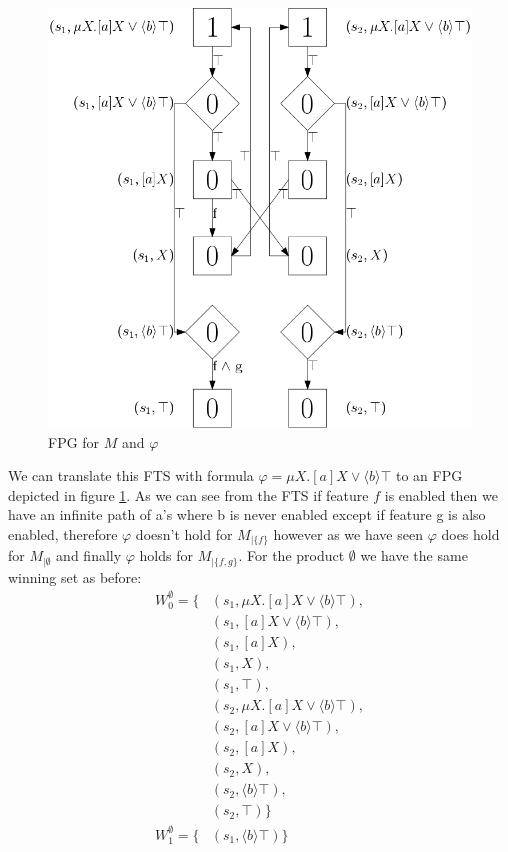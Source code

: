 \begin{figure}[h]
	\centering
	\includegraphics[scale=0.3]{Examples/ExamleVerification/FPG}
	\caption[FPG for $M$ and $\varphi$]{FPG for $M$ and $\varphi$}
	\label{fig:exverfpg}
\end{figure}
We can translate this FTS with formula $\varphi = \mu X. [a] X \vee \langle b \rangle \top$ to an FPG depicted in figure \ref{fig:exverfpg}. As we can see from the FTS if feature $f$ is enabled then we have an infinite path of a's where b is never enabled except if feature g is also enabled, therefore $\varphi$ doesn't hold for $M_{|\{f\}}$ however as we have seen $\varphi$ does hold for $M_{|\emptyset}$ and finally $\varphi$ holds for $M_{|\{f,g\}}$. For the product $\emptyset$ we have the same winning set as before:
\begin{align*}
W_0^\emptyset = \{& (s_1, \mu X.[a]X \vee \langle b \rangle \top),\\
& (s_1, [a]X \vee \langle b \rangle \top),\\
& (s_1, [a]X),\\
& (s_1, X),\\
& (s_1, \top),\\
& (s_2, \mu X.[a]X \vee \langle b \rangle \top),\\
& (s_2, [a]X \vee \langle b \rangle \top),\\
& (s_2, [a]X),\\
& (s_2, X),\\
& (s_2, \langle b \rangle \top),\\
& (s_2, \top)
\}\\
W_1^\emptyset = \{& (s_1, \langle b \rangle \top )\}
\end{align*}
